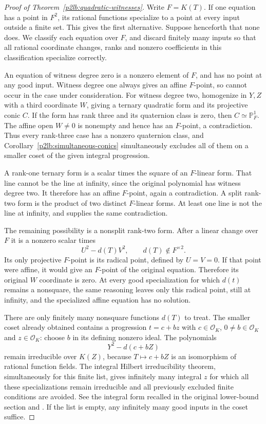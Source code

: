 \begin{proof}[Proof of Theorem~\ref{p2lb:quadratic-witnesses}]
Write $F=K(T)$.  If one equation has a point in $F^2$, its rational
functions specialize to a point at every input outside a finite set.
This gives the first alternative.  Suppose henceforth that none does.
We classify each equation over $F$, and discard finitely many inputs
so that all rational coordinate changes, ranks and nonzero coefficients
in this classification specialize correctly.

An equation of witness degree zero is a nonzero element of $F$, and
has no point at any good input.  Witness degree one always gives an
affine $F$-point, so cannot occur in the case under consideration.
For witness degree two, homogenize in $Y,Z$ with a third coordinate
$W$, giving a ternary quadratic form and its projective conic $C$.
If the form has rank three and its quaternion class is zero, then
$C\simeq\mathbb P^1_F$.  The affine open $W\ne0$ is nonempty
and hence has an $F$-point, a contradiction.  Thus every rank-three
case has a nonzero quaternion class, and
Corollary~\ref{p2lb:simultaneous-conics} simultaneously excludes all
of them on a smaller coset of the given integral progression.

A rank-one ternary form is a scalar times the square of an
$F$-linear form.  That line cannot be the line at infinity, since the
original polynomial has witness degree two.  It therefore has an
affine $F$-point, again a contradiction.  A split rank-two form is the
product of two distinct $F$-linear forms.  At least one line is not
the line at infinity, and supplies the same contradiction.

The remaining possibility is a nonsplit rank-two form.  After a linear
change over $F$ it is a nonzero scalar times
\[
                         U^2-d(T)V^2,
                         \qquad d(T)\notin F^{\times2}.
\]
Its only projective $F$-point is its radical point, defined by
$U=V=0$.  If that point were affine, it would give an $F$-point of
the original equation.  Therefore its original $W$ coordinate is
zero.  At every good specialization for which $d(t)$ remains a
nonsquare, the same reasoning leaves only this radical point, still
at infinity, and the specialized affine equation has no solution.

There are only finitely many nonsquare functions $d(T)$ to treat.
The smaller coset already obtained contains a progression
$t=c+bz$ with $c\in\mathcal O_K$, $0\ne b\in\mathcal O_K$
and $z\in\mathcal O_K$: choose $b$ in its defining nonzero ideal.
The polynomials
\[
                         Y^2-d(c+bZ)
\]
remain irreducible over $K(Z)$, because $T\mapsto c+bZ$ is an
isomorphism of rational function fields.  The integral Hilbert
irreducibility theorem, simultaneously for this finite list, gives
infinitely many integral $z$ for which all these specializations
remain irreducible and all previously excluded finite conditions are
avoided.  See the integral form recalled in the original lower-bound
section and \cite[Introduction]{lbMuller2001}.  If the list is empty,
any infinitely many good inputs in the coset suffice.


\end{proof}
